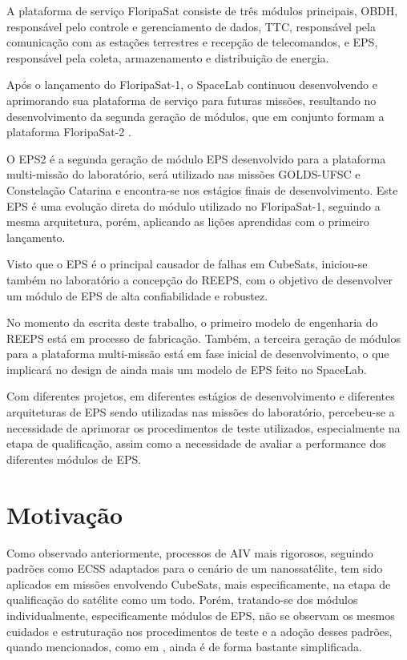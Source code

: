 A plataforma de serviço FloripaSat consiste de três módulos principais, \gls{OBDH}, responsável pelo controle e gerenciamento de dados, \gls{TTC}, responsável pela comunicação com as estações terrestres e recepção de telecomandos, e \gls{EPS}, responsável pela coleta, armazenamento e distribuição de energia.

Após o lançamento do FloripaSat-1, o SpaceLab continuou desenvolvendo e aprimorando sua plataforma de serviço para futuras missões, resultando no desenvolvimento da segunda geração de módulos, que em conjunto formam a plataforma FloripaSat-2 \cite{floripasat2}.

O \gls{EPS2} é a segunda geração de módulo \gls{EPS} desenvolvido para a plataforma multi-missão do laboratório, será utilizado nas missões GOLDS-UFSC e Constelação Catarina e encontra-se nos estágios finais de desenvolvimento. Este \gls{EPS} é uma evolução direta do módulo utilizado no FloripaSat-1, seguindo a mesma arquitetura, porém, aplicando as lições aprendidas com o primeiro lançamento.

Visto que o \gls{EPS} é o principal causador de falhas em CubeSats, iniciou-se também no laboratório a concepção do \gls{REEPS}, com o objetivo de desenvolver um módulo de \gls{EPS} de alta confiabilidade e robustez.

No momento da escrita deste trabalho, o primeiro modelo de engenharia do \gls{REEPS} está em processo de fabricação.
Também, a terceira geração de módulos para a plataforma multi-missão está em fase inicial de desenvolvimento, o que implicará no design de ainda mais um modelo de \gls{EPS} feito no SpaceLab.

Com diferentes projetos, em diferentes estágios de desenvolvimento e diferentes arquiteturas de \gls{EPS} sendo utilizadas nas missões do laboratório, percebeu-se a necessidade de aprimorar os procedimentos de teste utilizados, especialmente na etapa de qualificação, assim como a necessidade de avaliar a performance dos diferentes módulos de \gls{EPS}.

\section{Motivação}\label{sec:intro-motivacao}

Como observado anteriormente, processos de \gls{AIV} mais rigorosos, seguindo padrões como \gls{ECSS} adaptados para o cenário de um nanossatélite, tem sido aplicados em missões envolvendo CubeSats, mais especificamente, na etapa de qualificação do satélite como um todo.
Porém, tratando-se dos módulos individualmente, especificamente módulos de EPS, não se observam os mesmos cuidados e estruturação nos procedimentos de teste e a adoção desses padrões, quando mencionados, como em \textcite{mist-eps}, ainda é de forma bastante simplificada.

